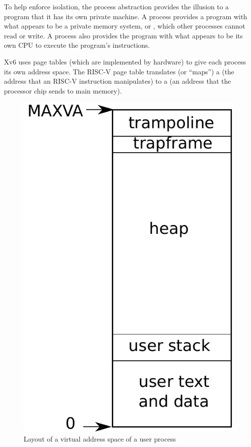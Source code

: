To help enforce isolation, the process abstraction provides the
illusion to a program that it has its own private machine.  A process provides
a program with what appears to be a private memory system, or
, 
which other processes cannot read or write.
A process also provides the program with what appears to be its own
CPU to execute the program's instructions.

Xv6 uses page tables (which are implemented by hardware) to give each process
its own address space. The RISC-V page table
translates (or ``maps'') a
(the address that an RISC-V instruction manipulates) to a
(an address that the processor chip sends to main memory).

\begin{figure}[t]
\center
\includegraphics[scale=0.5]{fig/as.pdf}
\caption{Layout of a virtual address space of a user process}
\label{fig:as}
\end{figure}

